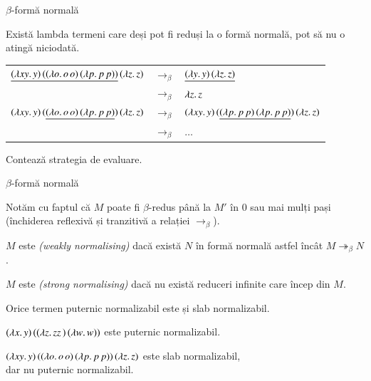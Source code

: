 \documentclass[xcolor=pdftex,romanian,colorlinks]{beamer}
\begin{document}
\begin{frame}[fragile]{$\beta$-formă normală}

Există lambda termeni care deși pot fi reduși la o formă normală, pot să nu o atingă niciodată.

{\footnotesize
\begin{center}
\begin{tabular}{rcl} 
$\underline{(\lambda xy.\,y)\, ((\lambda o.\,o\, o)\, (\lambda p.\,p\, p))}\, (\lambda z.\,z)$ & $\rightarrow_\beta$ & $\underline{(\lambda y.\,y)\, (\lambda z.\,z)}$ \\
&$\rightarrow_\beta$ & $\lambda z.\,z$ \\[.4cm] 
$(\lambda xy.\,y)\, (\underline{(\lambda o.\,o\, o)\, (\lambda p.\,p\, p)})\, (\lambda z.\,z)$ & $\rightarrow_\beta$ &  $(\lambda xy.\,y)\, (\underline{(\lambda p.\,p\, p)\, (\lambda p.\,p\, p)})\, (\lambda z.\,z)$ \\
&$\rightarrow_\beta$ & $\ldots$ \\[.4cm] 
\end{tabular}
\end{center}
}

Contează \alert{strategia de evaluare.}
\end{frame}

\begin{frame}[fragile]{$\beta$-formă normală}

Notăm cu  faptul că $M$ poate fi $\beta$-redus până la $M'$ în $0$ sau mai mulți pași  (închiderea reflexivă și tranzitivă a relației $\rightarrow_\beta$).

\medskip
$M$ este  \textit{(weakly normalising)} dacă există $N$ în formă normală astfel încât $M \twoheadrightarrow_\beta N$.

\medskip
$M$ este  \textit{(strong normalising)} dacă nu există reduceri infinite care încep din $M$.

\medskip
Orice termen puternic normalizabil este și slab normalizabil.

\medskip
\begin{example}

\smallskip
$(\lambda x.\,y)\, ((\lambda z.\,zz\, )\, (\lambda w.\,w))$ este {\color{True} puternic normalizabil}.

\smallskip
$(\lambda xy.\,y)\, ((\lambda o.\,o\, o)\, (\lambda p.\,p\, p))\, (\lambda z.\,z)$ este {\color{True} slab normalizabil}, \\ dar {\color{False} nu puternic normalizabil}.



\end{example}
\end{frame}
\end{document}
